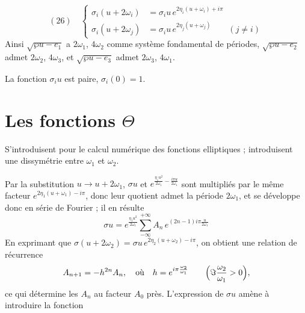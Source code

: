 \documentclass[11pt,a4paper]{article}
\begin{document}
\[
(26)\quad \left\lbrace
\begin{aligned}
\sigma_i(u+2\omega_i) &= \sigma_i u\, e^{2\eta_i(u+\omega_i) + i\pi}\\
\sigma_i(u+2\omega_j) &= \sigma_i u\, e^{2\eta_j(u+\omega_j)} \qquad (j\neq i)
\end{aligned}
\right.
\]
Ainsi $\sqrt{\wp u - e_1}$ a $2\omega_1$, $4\omega_2$ comme système fondamental de
périodes, $\sqrt{\wp u - e_2}$ admet $2\omega_2$, $4\omega_3$, et
$\sqrt{\wp u - e_3}$ admet $2\omega_3$, $4\omega_1$.

La fonction $\sigma_i u$ est paire, $\sigma_i(0) = 1$.

\section*{Les fonctions $\Theta$}

S'introduisent pour le calcul numérique des fonctions elliptiques ;
introduisent une dissymétrie entre $\omega_1$ et $\omega_2$.

Par la substitution $u\to u+2\omega_1$, $\sigma u$ et \struck{\ill{}}
$e^{\frac{\eta_1 u^2}{2\omega_1} - \frac{i\pi u}{2\omega_1}}$ sont multipliés par le
même facteur $e^{2\eta_1(u+\omega_1) - i\pi}$, donc leur quotient admet la
période $2\omega_1$, et se développe donc en série de Fourier ; il en résulte
\[
\sigma u = e^{\frac{\eta_1 u^2}{2\omega_1}} \sum_{-\infty}^{+\infty}
A_n\, e^{(2n-1)i\pi\frac{u}{2\omega_1}}
\]
En exprimant que $\sigma(u+2\omega_2) = \sigma u\, e^{2\eta_2(u+\omega_2) - i\pi}$,
on obtient une relation de récurrence
\[
A_{n+1} = -h^{2n}A_n, \quad\text{où}\quad h = e^{i\pi\frac{\omega_2}{\omega_1}}
\qquad \Bigl(\Im\frac{\omega_2}{\omega_1} > 0\Bigr),
\]
ce qui détermine les $A_n$ \struck{\ill{}} au facteur $A_0$ près.
L'expression de $\sigma u$ amène à introduire la fonction
\end{document}
